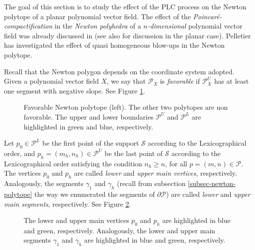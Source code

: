 \documentclass[12pt]{amsart}
\begin{document}
The goal of this section is to study the effect of the PLC process on the Newton polytope of a planar polynomial vector field. The effect of the \emph{Poincaré-compactification} in the \emph{Newton polyhedra} of a \emph{$n$-dimensional} polynomial vector field was already discussed in \cite[Proposition 4]{Kappos} (see also \cite{Berezovskaya2} for discussion in the planar case). Pelletier \cite{Pelletier} has investigated  the effect of quasi homogeneous blow-ups in the Newton polytope.

Recall that the Newton polygon depends on the coordinate system adopted. Given a polynomial vector field $X$, we say that $\mathcal{P}_{X}$ is \emph{favorable} if $\mathcal{P}^{U}_{X}$ has at least one segment with negative slope. See Figure \ref{fig-def-favorable}.


\begin{figure}[h]
\caption{\footnotesize{Favorable Newton polytope (left). The other two polytopes are non favorable. The upper and lower boundaries $\mathcal{P}^{U}$ and $\mathcal{P}^{L}$ are highlighted in green and blue, respectively.}}
\label{fig-def-favorable}
\end{figure}


Let $p_{0}\in\mathcal{P}^{L}$ be the first point of the support $\mathcal{S}$ according to the Lexicographical order, and  $p_{h} = (m_{h}, n_{h})\in\mathcal{P}^{U}$ be the last point of $\mathcal{S}$ according to the Lexicographical order satisfying the condition $n_{h} \geq n$, for all $p = (m, n)\in\mathcal{P}$. The vertices $p_{0}$ and $p_{h}$ are called \emph{lower} and \emph{upper main vertices}, respectively. Analogously, the segments $\gamma_{1}$ and $\gamma_{h}$ (recall from subsection \ref{subsec-newton-polytope} the way we enumerated the segments of $\partial\mathcal{P}$) are called \emph{lower} and \emph{upper main segments}, respectively. See Figure \ref{fig-lower-upper-segments}.

\begin{figure}[h]
\caption{\footnotesize{The lower and upper main vertices $p_{0}$ and $p_{h}$ are highlighted in blue and green, respectively. Analogously, the lower and upper main segments $\gamma_{1}$ and $\gamma_{h}$ are highlighted in blue and green, respectively.}}
\label{fig-lower-upper-segments}
\end{figure}
\end{document}
